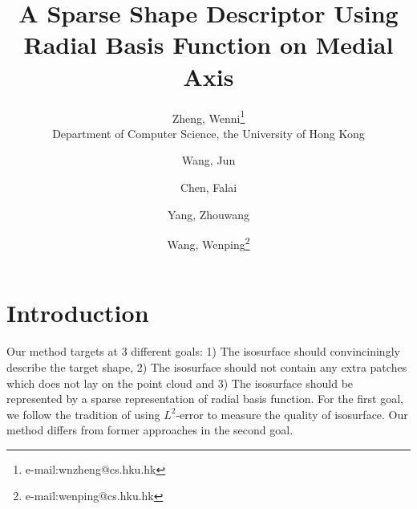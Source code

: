 \documentclass[annual]{acmsiggraph}
\title{A Sparse Shape Descriptor Using Radial Basis Function on Medial Axis}
\author{Zheng, Wenni\thanks{e-mail:wnzheng@cs.hku.hk}\\Department of Computer Science, the University of Hong Kong}
\author{Wang, Jun}
\author{Chen, Falai}
\author{Yang, Zhouwang}
\author{Wang, Wenping\thanks{e-mail:wenping@cs.hku.hk}}
\begin{document}

\maketitle

\begin{abstract}


\end{abstract}


\keywordlist


\copyrightspace

\section{Introduction}



Our method targets at 3 different goals: 1) The isosurface should convinciningly describe the target shape, 2) The isosurface should not contain any extra patches which does not lay on the point cloud and 3) The isosurface should be represented by a sparse representation of radial basis function. For the first goal, we follow the tradition of using $L^2$-error to measure the quality of isosurface. Our method differs from former approaches in the second goal.
\end{document}
